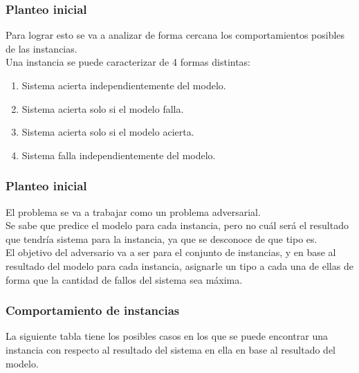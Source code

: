 \begin{frame}
\frametitle{Planteo inicial}
Para lograr esto se va a analizar de forma cercana los comportamientos posibles de las instancias. \\
\vspace{3mm}
Una instancia se puede caracterizar de 4 formas distintas:
\begin{enumerate}
\item Sistema acierta independientemente del modelo.
\item Sistema acierta solo si el modelo falla.
\item Sistema acierta solo si el modelo acierta.
\item Sistema falla independientemente del modelo.
\end{enumerate}
\end{frame}



\begin{frame}
\frametitle{Planteo inicial}
El problema se va a trabajar como un problema adversarial. \\
\vspace{3mm}
Se sabe que predice el modelo para cada instancia, pero no cu\'al ser\'a el resultado que tendr\'ia sistema para la instancia, ya que se desconoce de que tipo es. \\
\vspace{3mm}
El objetivo del adversario va a ser para el conjunto de instancias, y en base al resultado del modelo para cada instancia, asignarle un tipo a cada una de ellas de forma que la cantidad de fallos del sistema sea m\'axima.
\end{frame}



\begin{frame}
\frametitle{Comportamiento de instancias}
La siguiente tabla tiene los posibles casos en los que se puede encontrar una instancia con respecto al resultado del sistema en ella en base al resultado del modelo.
\end{frame}




